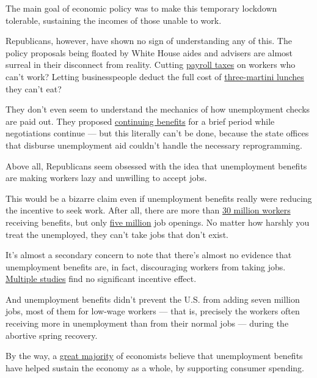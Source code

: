 The main goal of economic policy was to make this temporary lockdown
tolerable, sustaining the incomes of those unable to work.

Republicans, however, have shown no sign of understanding any of this.
The policy proposals being floated by White House aides and advisers are
almost surreal in their disconnect from reality. Cutting
\href{https://www.wsj.com/articles/how-trump-can-deliver-tax-relief-without-congress-11596396830}{payroll
taxes} on workers who can't work? Letting businesspeople deduct the full
cost of
\href{https://www.msnbc.com/rachel-maddow-show/gop-includes-three-martini-lunch-deduction-aid-package-n1235110}{three-martini
lunches} they can't eat?

They don't even seem to understand the mechanics of how unemployment
checks are paid out. They proposed
\href{https://www.cbsnews.com/news/unemployment-600-benefits-extension-senate-democrats-reject-white-house-short-term-extension/}{continuing
benefits} for a brief period while negotiations continue --- but this
literally can't be done, because the state offices that disburse
unemployment aid couldn't handle the necessary reprogramming.

Above all, Republicans seem obsessed with the idea that unemployment
benefits are making workers lazy and unwilling to accept jobs.

This would be a bizarre claim even if unemployment benefits really were
reducing the incentive to seek work. After all, there are more than
\href{https://www.dol.gov/ui/data.pdf}{30 million workers} receiving
benefits, but only \href{https://fred.stlouisfed.org/series/JTSJOL}{five
million} job openings. No matter how harshly you treat the unemployed,
they can't take jobs that don't exist.

It's almost a secondary concern to note that there's almost no evidence
that unemployment benefits are, in fact, discouraging workers from
taking jobs.
\href{https://twitter.com/ernietedeschi/status/1289919537538674689}{Multiple
studies} find no significant incentive effect.

And unemployment benefits didn't prevent the U.S. from adding seven
million jobs, most of them for low-wage workers --- that is, precisely
the workers often receiving more in unemployment than from their normal
jobs --- during the abortive spring recovery.

By the way, a
\href{https://fivethirtyeight.com/features/economists-think-congress-should-keep-paying-unemployed-workers-600-a-week-or-even-more/}{great
majority} of economists believe that unemployment benefits have helped
sustain the economy as a whole, by supporting consumer spending.


